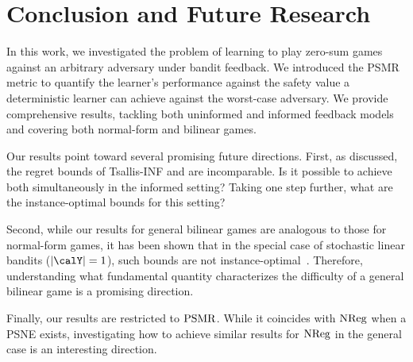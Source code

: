 \section{Conclusion and Future Research}\label{h1:discuss}

In this work, we investigated the problem of learning to play zero-sum games against an arbitrary adversary under bandit feedback. We introduced the PSMR metric to quantify the learner's performance against the safety value a deterministic learner can achieve against the worst-case adversary. We provide comprehensive results, tackling both uninformed and informed feedback models and covering both normal-form and bilinear games.

Our results point toward several promising future directions. First,
as discussed, the regret bounds of Tsallis-INF and \PureUCB{} are incomparable. 
    Is it possible to achieve both simultaneously in the informed setting?
    Taking one step further, what are the instance-optimal bounds for this setting? 
    
    
Second, while our results for general bilinear games are analogous to those for normal-form games, it has been shown that in the special case of stochastic linear bandits ($|\calY|=1$), such bounds are not instance-optimal~\citep{lattimore2017end}.
    Therefore, understanding what fundamental quantity characterizes the difficulty of a general bilinear game is a promising direction.
    

Finally, our results are restricted to $\mathrm{PSMR}$. While it coincides with $\mathrm{NReg}$ when a PSNE exists, investigating how to achieve similar results for $\mathrm{NReg}$ in the general case is an interesting direction.

